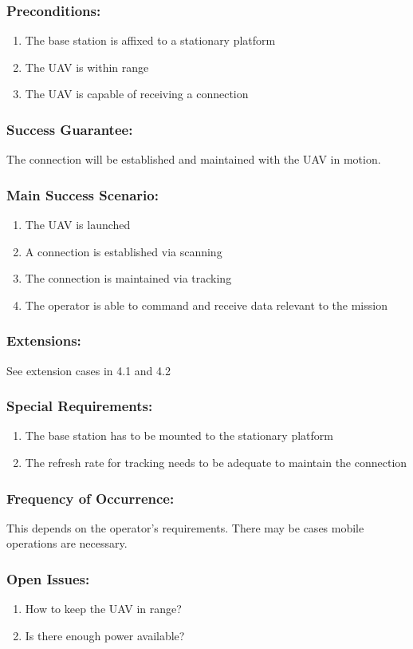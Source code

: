 \documentclass[ProductRequirements.tex]{subfiles}
\begin{document}
	\subsubsection*{Preconditions:}
	\begin{enumerate}\itemsep1pt
		\item The base station is affixed to a stationary platform
		\item The UAV is within range
		\item The UAV is capable of receiving a connection
	\end{enumerate}
	\subsubsection*{Success Guarantee:}
	The connection will be established and maintained with the UAV in motion.
	\subsubsection*{Main Success Scenario:}
	\begin{enumerate}\itemsep1pt
		\item The UAV is launched
		\item A connection is established via scanning
		\item The connection is maintained via tracking
		\item The operator is able to command and receive data relevant to the mission 
	\end{enumerate}
	\subsubsection*{Extensions:}
	See extension cases in 4.1 and 4.2
	\subsubsection*{Special Requirements:}
	\begin{enumerate}\itemsep1pt
		\item The base station has to be mounted to the stationary platform
		\item The refresh rate for tracking needs to be adequate to maintain the connection
	\end{enumerate}
	\subsubsection*{Frequency of Occurrence:}
	This depends on the operator's requirements. There may be cases mobile operations are necessary.
	\subsubsection*{Open Issues:}
	\begin{enumerate}\itemsep1pt
		\item How to keep the UAV in range?
		\item Is there enough power available?
	\end{enumerate}		

		
\end{document}

